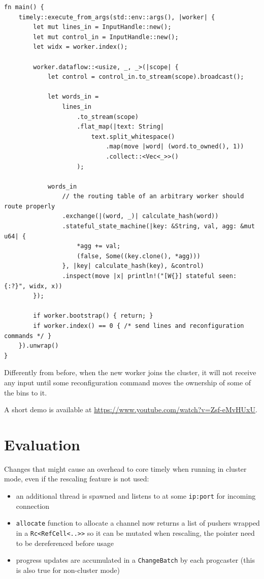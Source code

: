 \documentclass[12pt]{extarticle}
\begin{document}
\begin{verbatim}
fn main() {
    timely::execute_from_args(std::env::args(), |worker| {
        let mut lines_in = InputHandle::new();
        let mut control_in = InputHandle::new();
        let widx = worker.index();

        worker.dataflow::<usize, _, _>(|scope| {
            let control = control_in.to_stream(scope).broadcast();

            let words_in =
                lines_in
                    .to_stream(scope)
                    .flat_map(|text: String|
                        text.split_whitespace()
                            .map(move |word| (word.to_owned(), 1))
                            .collect::<Vec<_>>()
                    );

            words_in
                // the routing table of an arbitrary worker should route properly
                .exchange(|(word, _)| calculate_hash(word))
                .stateful_state_machine(|key: &String, val, agg: &mut u64| {
                    *agg += val;
                    (false, Some((key.clone(), *agg)))
                }, |key| calculate_hash(key), &control)
                .inspect(move |x| println!("[W{}] stateful seen: {:?}", widx, x))
        });

        if worker.bootstrap() { return; }
        if worker.index() == 0 { /* send lines and reconfiguration commands */ }
    }).unwrap()
}
\end{verbatim}


Differently from before, when the new worker joins the cluster, it will not receive any input until
some reconfiguration command moves the ownership of some of the bins to it.

A short demo is available at \url{https://www.youtube.com/watch?v=Zsf-eMvHUxU}.



\section{Evaluation}

Changes that might cause an overhead to core timely when running in cluster mode, even if the rescaling feature is not used:

\begin{itemize}
    \item an additional thread is spawned and listens to at some \verb|ip:port| for incoming connection
    \item \verb|allocate| function to allocate a channel now returns a list of pushers wrapped in a \verb|Rc<RefCell<..>>| so it can be mutated when rescaling,
              the pointer need to be dereferenced before usage
    \item progress updates are accumulated in a \verb|ChangeBatch| by each progcaster (this is also true for non-cluster mode)
\end{itemize}
\end{document}
